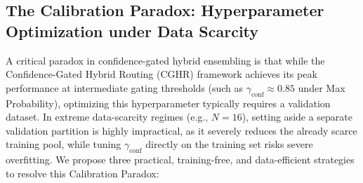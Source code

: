 \documentclass{article}
\theoremstyle{plain}
\theoremstyle{definition}
\theoremstyle{remark}
\begin{document}
\subsection{The Calibration Paradox: Hyperparameter Optimization under Data Scarcity}
\label{app:calibration_paradox}
A critical paradox in confidence-gated hybrid ensembling is that while the Confidence-Gated Hybrid Routing (CGHR) framework achieves its peak performance at intermediate gating thresholds (such as $\gamma_{\text{conf}} \approx 0.85$ under Max Probability), optimizing this hyperparameter typically requires a validation dataset. In extreme data-scarcity regimes (e.g., $N = 16$), setting aside a separate validation partition is highly impractical, as it severely reduces the already scarce training pool, while tuning $\gamma_{\text{conf}}$ directly on the training set risks severe overfitting. We propose three practical, training-free, and data-efficient strategies to resolve this Calibration Paradox:
\end{document}
